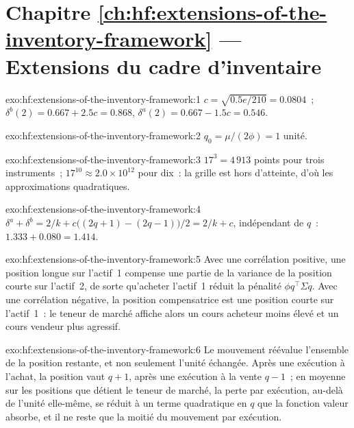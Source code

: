 \section*{Chapitre \ref{ch:hf:extensions-of-the-inventory-framework} --- Extensions du cadre d'inventaire}

\begin{solution}{exo:hf:extensions-of-the-inventory-framework:1}
$c=\sqrt{0.5e/210}=0.0804$~; $\delta^b(2)=0.667+2.5c=0.868$, $\delta^a(2)=0.667-1.5c=0.546$.
\end{solution}

\begin{solution}{exo:hf:extensions-of-the-inventory-framework:2}
$q_0=\mu/(2\phi)=1$ unité.
\end{solution}

\begin{solution}{exo:hf:extensions-of-the-inventory-framework:3}
$17^3=4\,913$ points pour trois instruments~; $17^{10}\approx2.0\times10^{12}$ pour dix~: la grille est hors d'atteinte, d'où les approximations quadratiques.
\end{solution}

\begin{solution}{exo:hf:extensions-of-the-inventory-framework:4}
$\delta^a+\delta^b=2/k+c\bigl((2q+1)-(2q-1)\bigr)/2=2/k+c$, indépendant de $q$~: $1.333+0.080=1.414$.
\end{solution}

\begin{solution}{exo:hf:extensions-of-the-inventory-framework:5}
Avec une corrélation positive, une position longue sur l'actif~1 compense une partie de la variance de la position courte sur l'actif~2, de sorte qu'acheter
l'actif~1 réduit la pénalité $\phi q^\top\Sigma q$. Avec une corrélation négative, la position compensatrice est une position courte sur l'actif~1~: le teneur de marché
affiche alors un cours acheteur moins élevé et un cours vendeur plus agressif.
\end{solution}

\begin{solution}{exo:hf:extensions-of-the-inventory-framework:6}
Le mouvement réévalue l'ensemble de la position restante, et non seulement l'unité échangée. Après une exécution à l'achat, la position vaut $q+1$, après une exécution à la vente $q-1$~; en moyenne
sur les positions que détient le teneur de marché, la perte par exécution, au-delà de l'unité elle-même, se réduit à un terme quadratique en $q$ que la fonction
valeur absorbe, et il ne reste que la moitié du mouvement par exécution.
\end{solution}

